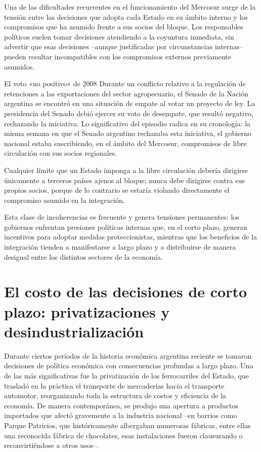 \documentclass[12pt,oneside]{book}
\begin{document}
Una de las dificultades recurrentes en el funcionamiento del Mercosur surge de la tensión entre las decisiones que adopta cada Estado en su ámbito interno y los compromisos que ha asumido frente a sus socios del bloque. Los responsables políticos suelen tomar decisiones atendiendo a la coyuntura inmediata, sin advertir que esas decisiones --aunque justificadas por circunstancias internas-- pueden resultar incompatibles con los compromisos externos previamente asumidos.

\begin{ejemplo}{El voto «no positivo» de 2008}
Durante un conflicto relativo a la regulación de retenciones a las exportaciones del sector agropecuario, el Senado de la Nación argentina se encontró en una situación de empate al votar un proyecto de ley. La presidencia del Senado debió ejercer su voto de desempate, que resultó negativo, rechazando la iniciativa. Lo significativo del episodio radica en su cronología: la misma semana en que el Senado argentino rechazaba esta iniciativa, el gobierno nacional estaba suscribiendo, en el ámbito del Mercosur, compromisos de libre circulación con sus socios regionales.
\end{ejemplo}

\begin{importante}
Cualquier límite que un Estado imponga a la libre circulación debería dirigirse únicamente a terceros países ajenos al bloque; nunca debe dirigirse contra sus propios socios, porque de lo contrario se estaría violando directamente el compromiso asumido en la integración.
\end{importante}

Esta clase de incoherencias es frecuente y genera tensiones permanentes: los gobiernos enfrentan presiones políticas internas que, en el corto plazo, generan incentivos para adoptar medidas proteccionistas, mientras que los beneficios de la integración tienden a manifestarse a largo plazo y a distribuirse de manera desigual entre los distintos sectores de la economía.

\section{El costo de las decisiones de corto plazo: privatizaciones y desindustrialización}

Durante ciertos períodos de la historia económica argentina reciente se tomaron decisiones de política económica con consecuencias profundas a largo plazo. Una de las más significativas fue la privatización de los ferrocarriles del Estado, que trasladó en la práctica el transporte de mercaderías hacia el transporte automotor, reorganizando toda la estructura de costos y eficiencia de la economía. De manera contemporánea, se produjo una apertura a productos importados que afectó gravemente a la industria nacional --en barrios como Parque Patricios, que históricamente albergaban numerosas fábricas, entre ellas una reconocida fábrica de chocolates, esas instalaciones fueron clausurando o reconvirtiéndose a otros usos--.
\end{document}
